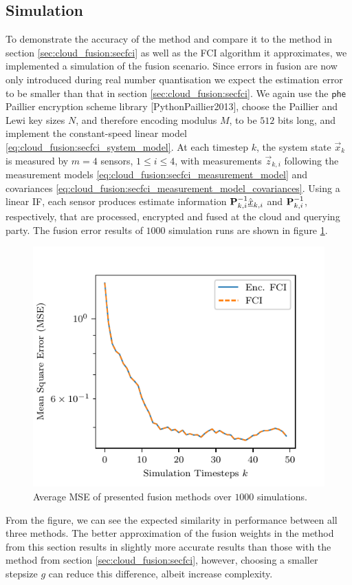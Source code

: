 \subsection{Simulation}\label{subsec:cloud_fusion:secfci2_simulation}
To demonstrate the accuracy of the method and compare it to the method in section \ref{sec:cloud_fusion:secfci} as well as the FCI algorithm it approximates, we implemented a simulation of the fusion scenario. Since errors in fusion are now only introduced during real number quantisation we expect the estimation error to be smaller than that in section \ref{sec:cloud_fusion:secfci}. We again use the $\mathsf{phe}$ Paillier encryption scheme library [PythonPaillier2013], choose the Paillier and Lewi key sizes $N$, and therefore encoding modulus $M$, to be $512$ bits long, and implement the constant-speed linear model \eqref{eq:cloud_fusion:secfci_system_model}. At each timestep $k$, the system state $\vec{x}_k$ is measured by $m=4$ sensors, $1\leq i \leq 4$, with measurements $\vec{z}_{k,i}$ following the measurement models \eqref{eq:cloud_fusion:secfci_measurement_model} and covariances \eqref{eq:cloud_fusion:secfci_measurement_model_covariances}. Using a linear IF, each sensor produces estimate information ${{\mathbf{P}}}_{k, i}^{-1}\hat{{\underline{x}}}_{k, i}$ and ${{\mathbf{P}}}_{k, i}^{-1}$, respectively, that are processed, encrypted and fused at the cloud and querying party. The fusion error results of $1000$ simulation runs are shown in figure \ref{fig:cloud_fusion:secfci2_sim_error}. 
\begin{figure}[htbp]
    \centering
    \includegraphics{figures/sim_error_plot.pdf}
    \caption{Average MSE of presented fusion methods over $1000$ simulations.}
    \label{fig:cloud_fusion:secfci2_sim_error}
\end{figure}
From the figure, we can see the expected similarity in performance between all three methods. The better approximation of the fusion weights in the method from this section results in slightly more accurate results than those with the method from section \ref{sec:cloud_fusion:secfci}, however, choosing a smaller stepsize $g$ can reduce this difference, albeit increase complexity.

